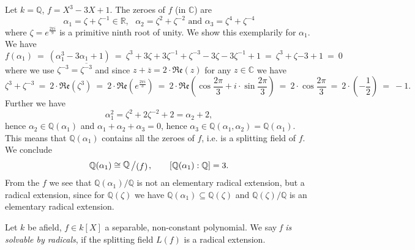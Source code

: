 \documentclass[11pt]{book}
\theoremstyle{nonumberbreak}
\newenvironment{defin}[1][]{\ifthenelse{\equal{#1}{}}{\definition}{\definition[#1]}\rm}{\enddefinition}
\newenvironment{ex}[1][]{\ifthenelse{\equal{#1}{}}{\example}{\example[#1]}\rm}{\endexample}
\newcommand{\slant}[2]{{\raisebox{.1em}{$#1$}\left/\raisebox{-.1em}{$#2$}\right.}}
\begin{document}
\begin{spacing}{1.3}
\begin{ex} %
Let $k=\mathbb{Q}$, $f=X^3-3X+1$.
The zeroes of $f$ (in $\mathbb{C}$) are 
$$ \alpha_1= \zeta + \zeta^{-1} \in \mathbb{R}, \textrm{ }\alpha_2=\zeta^2 + \zeta^{-2}\textrm{ and }\alpha_3=\zeta^4 + \zeta^{-4}$$
where $\zeta = e^{\frac{2\pi i}{9}}$ is a primitive ninth root of unity. We show this exemplarily for $\alpha_1$. We have
$$f(\alpha_1)\ =\ \left(\alpha_1^3-3 \alpha_1+1\right)\ =\ \zeta^3+ 3\zeta + 3\zeta^{-1}+\zeta^{-3} -3 \zeta - 3\zeta^{-1}+1\ =\ \zeta^3+ \zeta{-3}+1\ =\ 0$$
where we use $\zeta^{-3}= \overline{\zeta^{-3}}$ and since $z+\overline{z}=2 \cdot \mathfrak{Re}(z)$ for any $z \in \mathbb{C}$ we have
$$\zeta^3+ \zeta^{-3}\ =\ 2 \cdot \mathfrak{Re}\left(\zeta^3\right)\ =\ 2 \cdot \mathfrak{Re} \left(e^{\frac{2 \pi i}{3}}\right)\ =\ 2 \cdot \mathfrak{Re} \left(\cos\frac{2 \pi}{3} + i \cdot \sin \frac{2 \pi}{3}\right)\ 
=\ 2 \cdot \cos\frac{2 \pi}{3} \ =\ 2 \cdot \left(- \frac{1}{2}\right)\ =\ -1.$$
Further we have $$\alpha_1^2=\zeta^2 + 2 \zeta^{-2}+2=\alpha_2+2,$$hence $\alpha_2 \in \mathbb{Q}(\alpha_1)$ and $\alpha_1 + \alpha_2 + \alpha_3 =0$, hence $\alpha_3 \in \mathbb{Q}(\alpha_1, \alpha_2) = \mathbb{Q}(\alpha_1)$.\\
This means that $\mathbb{Q}(\alpha_1)$ contains all the zeroes of $f$, i.e. is a splitting field of $f$.
We conclude $$\mathbb{Q}(\alpha_1) \cong \slant{\mathbb{Q}}{( f )}, \qquad [\mathbb{Q}(\alpha_1):\mathbb{Q}]=3.$$
From the $f$ we see that $\mathbb{Q}(\alpha_1)/\mathbb{Q}$ is not an elementary radical extension, but a radical extension, since for $\mathbb{Q}(\zeta)$ we have $\mathbb{Q}(\alpha_1) \subseteq \mathbb{Q}(\zeta)$ and $\mathbb{Q}(\zeta)/\mathbb{Q}$ is an elementary radical extension. 
\end{ex}

\begin{defin} %
Let $k$ be afield, $f \in k[X]$ a separable, non-constant polynomial. We say \textit{f is solvable by radicals}, if the splitting field $L(f)$ is a radical extension. \end{defin}


\end{spacing}
\end{document}

